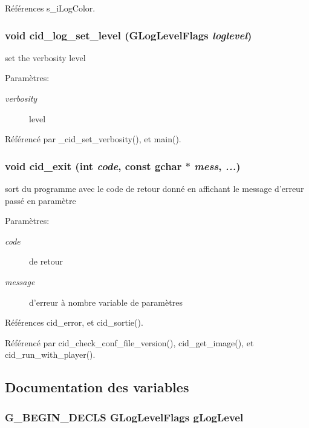 Références s\_\-iLogColor.
\subsubsection{\setlength{\rightskip}{0pt plus 5cm}void cid\_\-log\_\-set\_\-level (GLogLevelFlags {\em loglevel})}\label{cid-messages_8h_9f6543baa01f0cd02d43abcafbc667d4}


set the verbosity level \begin{Desc}
\item[Paramètres:]
\begin{description}
\item[{\em verbosity}]level \end{description}
\end{Desc}


Référencé par \_\-cid\_\-set\_\-verbosity(), et main().
\subsubsection{\setlength{\rightskip}{0pt plus 5cm}void cid\_\-exit (int {\em code}, \/  const gchar $\ast$ {\em mess}, \/   {\em ...})}\label{cid-messages_8h_a884a28c1f60af6eed13da9bb191dd25}


sort du programme avec le code de retour donné en affichant le message d'erreur passé en paramètre \begin{Desc}
\item[Paramètres:]
\begin{description}
\item[{\em code}]de retour \item[{\em message}]d'erreur à nombre variable de paramètres \end{description}
\end{Desc}


Références cid\_\-error, et cid\_\-sortie().

Référencé par cid\_\-check\_\-conf\_\-file\_\-version(), cid\_\-get\_\-image(), et cid\_\-run\_\-with\_\-player().

\subsection{Documentation des variables}
\subsubsection{\setlength{\rightskip}{0pt plus 5cm}G\_\-BEGIN\_\-DECLS GLogLevelFlags {\bf gLogLevel}}\label{cid-messages_8h_695fbfefe73b2058fb5ea21bb16bacb3}



